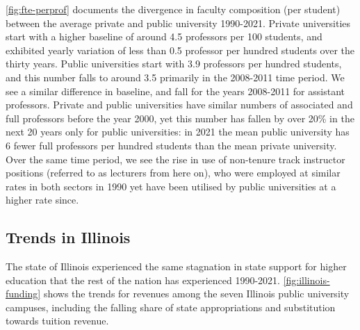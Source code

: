 \autoref{fig:fte-perprof} documents the divergence in faculty composition (per student) between the average private and public university 1990-2021.
Private universities start with  a higher baseline of around 4.5 professors per 100 students, and exhibited yearly variation of less than 0.5 professor per hundred students over the thirty years.
Public universities start with 3.9 professors per hundred students, and this number falls to around 3.5 primarily in the 2008-2011 time period.
We see a similar difference in baseline, and fall for the years 2008-2011 for assistant professors.
Private and public universities have similar numbers of associated and full professors before the year 2000, yet this number has fallen by over 20\% in the next 20 years only for public universities: in 2021 the mean public university has 6 fewer full professors per hundred students than the mean private university.
Over the same time period, we see the rise in use of non-tenure track instructor positions (referred to as lecturers from here on), who were employed at similar rates in both sectors in 1990 yet have been utilised by public universities at a higher rate since.

\subsection{Trends in Illinois}
\label{sec:trends-illinois}

The state of Illinois experienced the same stagnation in state support for higher education that the rest of the nation has experienced 1990-2021.
\autoref{fig:illinois-funding} shows the trends for revenues among the seven Illinois public university campuses, including the falling share of state appropriations and substitution towards tuition revenue.


